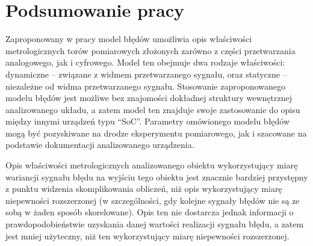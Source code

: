 \chapter{Podsumowanie pracy}

Zaproponowany w pracy model błędów umożliwia opis właściwości metrologicznych torów pomiarowych złożonych zarówno z części przetwarzania analogowego, jak i cyfrowego. Model ten obejmuje dwa rodzaje właściwości: dynamiczne -- związane z widmem przetwarzanego sygnału, oraz statyczne -- niezależne od widma przetwarzanego sygnału. Stosowanie zaproponowanego modelu błędów jest możliwe bez znajomości dokładnej struktury wewnętrznej analizowanego układu, a zatem model ten znajduje swoje zastosowanie do opisu między innymi urządzeń typu \enquote{SoC}. Parametry omówionego modelu błędów mogą być pozyskiwane na drodze eksperymentu pomiarowego, jak i szacowane na podstawie dokumentacji analizowanego urządzenia.

Opis właściwości metrologicznych analizowanego obiektu wykorzystujący miarę wariancji sygnału błędu na wyjściu tego obiektu jest znacznie bardziej przystępny z punktu widzenia skomplikowania obliczeń, niż opis wykorzystujący miarę niepewności rozszerzonej (w szczególności, gdy kolejne sygnały błędów nie są ze sobą w żaden sposób skorelowane). Opis ten nie dostarcza jednak informacji o prawdopodobieństwie uzyskania danej wartości realizacji sygnału błędu, a zatem jest mniej użyteczny, niż ten wykorzystujący miarę niepewności rozszerzonej.

